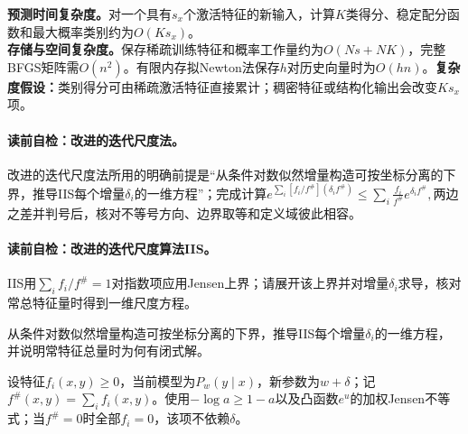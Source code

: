 \begin{complexitybox}
\textbf{预测时间复杂度。}对一个具有$s_x$个激活特征的新输入，计算$K$类得分、稳定配分函数和最大概率类别约为$O(Ks_x)$。\\
\textbf{存储与空间复杂度。}保存稀疏训练特征和概率工作量约为$O(Ns+NK)$，完整BFGS矩阵需$O(n^2)$。有限内存拟Newton法保存$h$对历史向量时为$O(hn)$。\textbf{复杂度假设：}类别得分可由稀疏激活特征直接累计；稠密特征或结构化输出会改变$Ks_x$项。
\end{complexitybox}

\paragraph{读前自检：改进的迭代尺度法。}改进的迭代尺度法所用的明确前提是“从条件对数似然增量构造可按坐标分离的下界，推导IIS每个增量$\delta_i$的一维方程”；完成计算$e^{\sum_i[f_i/f^\#](\delta_i f^\#)} \leq\sum_i\frac{f_i}{f^\#}e^{\delta_i f^\#},$两边之差并判号后，核对不等号方向、边界取等和定义域彼此相容。\par
\paragraph{读前自检：改进的迭代尺度算法IIS。}IIS用$\sum_i f_i/f^{\#}=1$对指数项应用Jensen上界；请展开该上界并对增量$\delta_i$求导，核对常总特征量时得到一维尺度方程。\par


\begin{derivationgoalbox}
从条件对数似然增量构造可按坐标分离的下界，推导IIS每个增量$\delta_i$的一维方程，并说明常特征总量时为何有闭式解。
\end{derivationgoalbox}
\begin{derivationprepbox}
设特征$f_i(x,y)\geq0$，当前模型为$P_w(y\mid x)$，新参数为$w+\delta$；记$f^\#(x,y)=\sum_i f_i(x,y)$。使用$-\log a\geq1-a$以及凸函数$e^u$的加权Jensen不等式；当$f^\#=0$时全部$f_i=0$，该项不依赖$\delta$。
\end{derivationprepbox}

